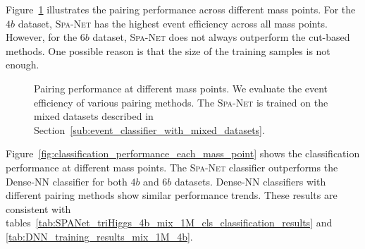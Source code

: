 \documentclass[12pt]{article}
\begin{document}
        Figure~\ref{fig:pairing_performance_each_mass_point} illustrates the pairing performance across different mass points. For the $4b$ dataset, \textsc{Spa-Net} has the highest event efficiency across all mass points. However, for the $6b$ dataset, \textsc{Spa-Net} does not always outperform the cut-based methods. One possible reason is that the size of the training samples is not enough.
        \begin{figure}[htpb]
            \centering
            \caption{Pairing performance at different mass points. We evaluate the event efficiency of various pairing methods. The \textsc{Spa-Net} is trained on the mixed datasets described in Section~\ref{sub:event_classifier_with_mixed_datasets}.}  
            \label{fig:pairing_performance_each_mass_point}  
        \end{figure}

        Figure~\ref{fig:classification_performance_each_mass_point} shows the classification performance at different mass points. The \textsc{Spa-Net} classifier outperforms the Dense-NN classifier for both $4b$ and $6b$ datasets. Dense-NN classifiers with different pairing methods show similar performance trends. These results are consistent with tables~\ref{tab:SPANet_triHiggs_4b_mix_1M_cls_classification_results} and \ref{tab:DNN_training_results_mix_1M_4b}.  
\end{document}
